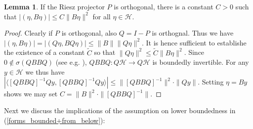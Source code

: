\documentclass[reqno,12pt,letterpaper]{amsart}
\numberwithin{equation}{section}
\newcommand{\1}{\mathds{1}}
\theoremstyle{definition}
\newtheorem{Lemma}[Th]{Lemma}
\begin{document}
\begin{Lemma}\label{Riesz_proj_proof}
	If the Riesz projector $P$  is orthogonal, there is a constant $C > 0$ such that   $|(\eta,  B \eta)| \leq C \|B\eta\|^2$ for all $ \eta \in \mathcal{H}$.
\end{Lemma}

\begin{proof}
	Clearly if $P$ is orthogonal, also $Q = I - P$ is orthognal. 
	Thus we have $|(\eta,  B \eta)| = |(Q\eta,  B Q\eta)| \leq \|B\| \|Q \eta\|^2$. It is hence sufficient to establishe the existence of a constant $\tilde{C}$ so that $\|Q \eta\|^2 \leq \tilde{C} \|B \eta\|^2$. Since   $0 \notin \sigma(Q BB Q)$ (see e.g. \cite{HislopSigal1996}),  $Q BB Q: Q \mathcal{H} \rightarrow  Q \mathcal{H}$ is boundedly invertible. For any $y \in \mathcal{H}$ we thus have
	$
	|\langle [Q BB Q]^{-1} Qy ,[Q BB Q]^{-1} Qy  \rangle| \leq 
	\|[Q BB Q]^{-1}\|^2 \cdot \|Q y\|.
	$
	Setting $\eta = By$ shows we may set $C = \|B\|^2 \cdot \|[Q BB Q]^{-1}\| $.
\end{proof}



Next we discuss the implications of the assumption on lower boundedness in (\ref{forms_bounded+from_below}):
\end{document}
